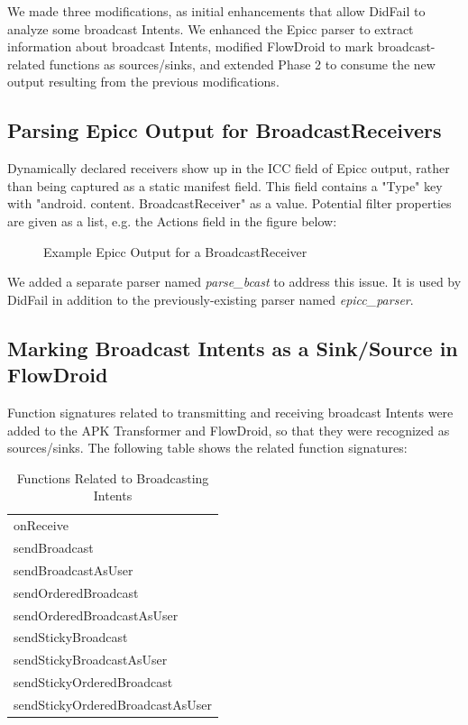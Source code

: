 We made three modifications, as initial enhancements that allow DidFail to analyze some broadcast Intents. We enhanced the Epicc parser to extract information about broadcast Intents, modified FlowDroid to mark broadcast-related functions as sources/sinks, and extended Phase 2 to consume the new output resulting from the previous modifications.

\subsection{Parsing Epicc Output for BroadcastReceivers}
Dynamically declared receivers show up in the ICC field of Epicc output, rather than being captured as a static manifest field.   This field contains a "Type" key with "android. content. BroadcastReceiver" as a value.  Potential filter properties are given as a list, e.g. the Actions field in the figure below:

\begin{figure}[!h]

\caption{Example Epicc Output for a BroadcastReceiver}
\end{figure}

We added a separate parser named \emph{parse\_bcast} to address this issue. It is used by DidFail in addition to the previously-existing parser named \emph{epicc\_parser}.

\subsection{Marking Broadcast Intents as a Sink/Source in FlowDroid}
Function signatures related to transmitting and receiving broadcast Intents were added to the APK Transformer and FlowDroid, so that they were recognized as sources/sinks. The following table shows the related function signatures:
\begin{table}[!h]
\renewcommand{\arraystretch}{1.3}
\caption{Functions Related to Broadcasting Intents}
\label{fnc_bcast}
\centering
\begin{tabular}{l}
\hline
onReceive \\
sendBroadcast \\
sendBroadcastAsUser \\
sendOrderedBroadcast \\
sendOrderedBroadcastAsUser \\
sendStickyBroadcast \\
sendStickyBroadcastAsUser \\
sendStickyOrderedBroadcast \\
sendStickyOrderedBroadcastAsUser \\
\hline
\end{tabular}
\end{table}

